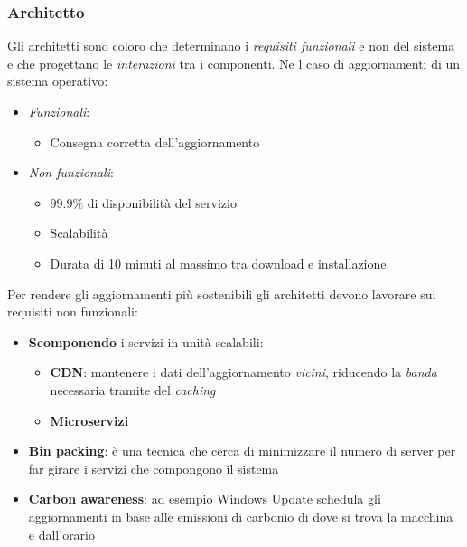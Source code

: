 \subsubsection{Architetto}
Gli architetti sono coloro che determinano i \emph{requisiti funzionali} e non del sistema e che progettano le \emph{interazioni} tra i componenti. Ne l caso di aggiornamenti di un sistema operativo:
\begin{itemize}
	\item \emph{Funzionali}:
	\begin{itemize}
		\item Consegna corretta dell'aggiornamento
	\end{itemize}
	\item \emph{Non funzionali}:
	\begin{itemize}
		\item $99.9\%$ di disponibilità del servizio
		\item Scalabilità
		\item Durata di 10 minuti al massimo tra download e installazione
	\end{itemize}
\end{itemize}
Per rendere gli aggiornamenti più sostenibili gli architetti devono lavorare sui requisiti non funzionali:
\begin{itemize}
	\item \textbf{Scomponendo} i servizi in unità scalabili:
	\begin{itemize}
		\item \textbf{CDN}: mantenere i dati dell'aggiornamento \emph{vicini}, riducendo la \emph{banda} necessaria tramite del \emph{caching}
		\item \textbf{Microservizi}
	\end{itemize}
	\item \textbf{Bin packing}: è una tecnica che cerca di minimizzare il numero di server per far girare i servizi che compongono il sistema
	\item \textbf{Carbon awareness}: ad esempio Windows Update schedula gli aggiornamenti in base alle emissioni di carbonio di dove si trova la macchina e dall'orario
\end{itemize}
